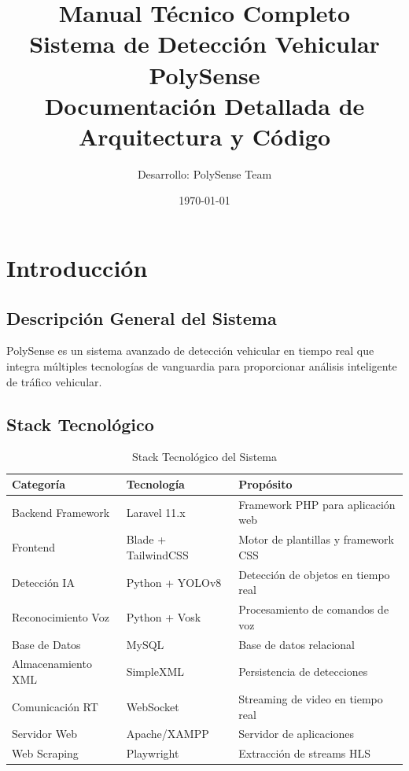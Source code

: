 \documentclass[12pt,a4paper]{article}
\title{\Huge\textbf{Manual Técnico Completo}\\
\Large Sistema de Detección Vehicular PolySense\\
\large Documentación Detallada de Arquitectura y Código}
\author{Desarrollo: PolySense Team}
\date{\today}
\begin{document}
\maketitle
\newpage

\tableofcontents
\newpage

\listoffigures
\newpage

\listoflistings
\newpage

\section{Introducción}

\subsection{Descripción General del Sistema}

PolySense es un sistema avanzado de detección vehicular en tiempo real que integra múltiples tecnologías de vanguardia para proporcionar análisis inteligente de tráfico vehicular.

\subsection{Stack Tecnológico}

\begin{table}[H]
\centering
\begin{tabular}{|l|l|p{6cm}|}
\hline
\textbf{Categoría} & \textbf{Tecnología} & \textbf{Propósito} \\
\hline
Backend Framework & Laravel 11.x & Framework PHP para aplicación web \\
\hline
Frontend & Blade + TailwindCSS & Motor de plantillas y framework CSS \\
\hline
Detección IA & Python + YOLOv8 & Detección de objetos en tiempo real \\
\hline
Reconocimiento Voz & Python + Vosk & Procesamiento de comandos de voz \\
\hline
Base de Datos & MySQL & Base de datos relacional \\
\hline
Almacenamiento XML & SimpleXML & Persistencia de detecciones \\
\hline
Comunicación RT & WebSocket & Streaming de video en tiempo real \\
\hline
Servidor Web & Apache/XAMPP & Servidor de aplicaciones \\
\hline
Web Scraping & Playwright & Extracción de streams HLS \\
\hline
\end{tabular}
\caption{Stack Tecnológico del Sistema}
\end{table}
\end{document}
